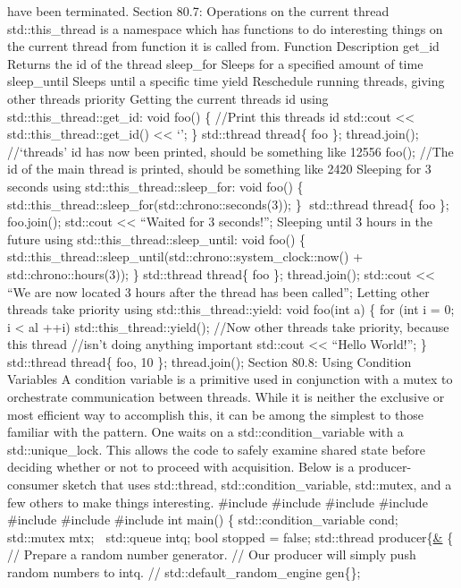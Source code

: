 have been terminated. Section 80.7: Operations on the current thread
std::this\_thread is a namespace which has functions to do interesting
things on the current thread from function it is called from. Function
Description get\_id Returns the id of the thread sleep\_for Sleeps for a
speciﬁed amount of time sleep\_until Sleeps until a speciﬁc time yield
Reschedule running threads, giving other threads priority Getting the
current threads id using std::this\_thread::get\_id: void foo() \{
//Print this threads id std::cout \textless\textless{}
std::this\_thread::get\_id() \textless\textless{} `\n'; \} std::thread
thread\{ foo \}; thread.join(); //`threads' id has now been printed,
should be something like 12556 foo(); //The id of the main thread is
printed, should be something like 2420 Sleeping for 3 seconds using
std::this\_thread::sleep\_for: void foo() \{
std::this\_thread::sleep\_for(std::chrono::seconds(3)); \} std::thread
thread\{ foo \}; foo.join(); std::cout \textless\textless{} ``Waited for
3 seconds!\n''; Sleeping until 3 hours in the future using
std::this\_thread::sleep\_until: void foo() \{
std::this\_thread::sleep\_until(std::chrono::system\_clock::now() +
std::chrono::hours(3)); \} std::thread thread\{ foo \}; thread.join();
std::cout \textless\textless{} ``We are now located 3 hours after the
thread has been called\n''; Letting other threads take priority using
std::this\_thread::yield: void foo(int a) \{ for (int i = 0; i
\textless{} al ++i) std::this\_thread::yield(); //Now other threads take
priority, because this thread //isn't doing anything important std::cout
\textless\textless{} ``Hello World!\n''; \} std::thread thread\{ foo, 10
\}; thread.join(); Section 80.8: Using Condition Variables A condition
variable is a primitive used in conjunction with a mutex to orchestrate
communication between threads. While it is neither the exclusive or most
eﬃcient way to accomplish this, it can be among the simplest to those
familiar with the pattern. One waits on a std::condition\_variable with
a std::unique\_lock. This allows the code to safely examine shared state
before deciding whether or not to proceed with acquisition. Below is a
producer-consumer sketch that uses std::thread,
std::condition\_variable, std::mutex, and a few others to make things
interesting. \#include \#include \#include \#include \#include \#include
\#include int main() \{ std::condition\_variable cond; std::mutex mtx; 
std::queue intq; bool stopped = false; std::thread producer\{\href{}{\&}
\{ // Prepare a random number generator. // Our producer will simply
push random numbers to intq. // std::default\_random\_engine gen\{\};
